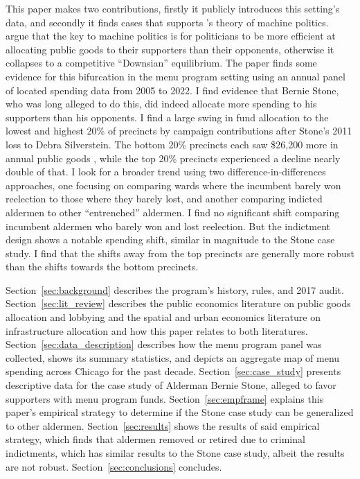 This paper makes two contributions, firstly it publicly introduces this setting's data, and secondly it finds cases that supports \cite{dixit_londregan1996}'s theory of machine politics.
\cite{dixit_londregan1996} argue that the key to machine politics is for politicians to be more efficient at allocating public goods to their supporters than their opponents, otherwise it collapses to a competitive ``Downsian'' equilibrium.
The paper finds some evidence for this bifurcation in the menu program setting using an annual panel of located spending data from 2005 to 2022.
I find evidence that Bernie Stone, who was long alleged to do this, did indeed allocate more spending to his supporters than his opponents.
I find a large swing in fund allocation to the lowest and highest 20\% of precincts by campaign contributions after Stone's 2011 loss to Debra Silverstein. 
The bottom 20\% precincts each saw \$26,200 more in annual public goods , while the top 20\% precincts experienced a decline nearly double of that.
I look for a broader trend using two difference-in-differences approaches, one focusing on comparing wards where the incumbent barely won reelection to those where they barely lost, and another comparing indicted aldermen to other ``entrenched'' aldermen.
I find no significant shift comparing incumbent aldermen who barely won and lost reelection.
But the indictment design shows a notable spending shift, similar in magnitude to the Stone case study.
I find that the shifts away from the top precincts are generally more robust than the shifts towards the bottom precincts.



Section~\ref{sec:background} describes the program's history, rules, and 2017 audit.
Section~\ref{sec:lit_review} describes the public economics literature on public goods allocation and lobbying and the spatial and urban economics literature on infrastructure allocation and how this paper relates to both literatures.
Section~\ref{sec:data_description} describes how the menu program panel was collected, shows its summary statistics, and depicts an aggregate map of menu spending across Chicago for the past decade.
Section~\ref{sec:case_study} presents descriptive data for the case study of Alderman Bernie Stone, alleged to favor supporters with menu program funds. 
Section~\ref{sec:empframe} explains this paper's empirical strategy to determine if the Stone case study can be generalized to other aldermen.
Section~\ref{sec:results} shows the results of said empirical strategy, which finds that aldermen removed or retired due to criminal indictments, which has similar results to the Stone case study, albeit the results are not robust. 
Section~\ref{sec:conclusions} concludes.

